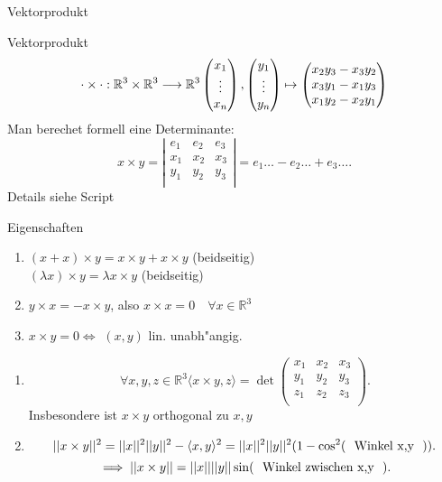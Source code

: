 \documentclass[class=article, crop=false]{standalone}
\begin{document}
\begin{zettel}{Vektorprodukt}
\begin{flashcard}[9z5podc9]{Vektorprodukt}
	\[
		\cdot \times \cdot  : \mathbb{R}^3 \times \mathbb{R}^3 \longrightarrow \mathbb{R}^3\\ \begin{pmatrix}x_1\\ \vdots \\x_n\end{pmatrix}, \begin{pmatrix}y_1\\ \vdots \\ y_n\end{pmatrix} \mapsto \begin{pmatrix}
			x_2 y_3 - x_3 y_2 \\
			x_3 y_1 - x_1 y_3 \\
			x_1 y_2 - x_2 y_1 \\
		\end{pmatrix}
	\]
	Man berechet formell eine Determinante:
	\[
		x \times y = \left|\begin{matrix}
			e_1 & e_2 & e_3 \\
			x_1 & x_2 & x_3 \\
			y_1 & y_2 & y_3 \\
		\end{matrix}\right| = e_1 \dots - e_2 \dots + e_3 \dots
	.\]
	Details siehe Script
\end{flashcard}

\begin{remark}
	Eigenschaften
	\begin{enumerate}
		\item $(x + x )\times y =  x \times  y +  x \times y$ (beidseitig)\\

		      $(\lambda x )\times y =  \lambda  x \times y$ (beidseitig)
		\item $y \times  x =  -  x \times y$, also $x \times x = 0 \quad \forall x \in  \mathbb{R}^3 $
		\item $x \times y = 0 \iff $ $(x,y)$ lin. unabh"angig.
	\end{enumerate}
\end{remark}
\begin{lemma}[4.1]
	\begin{enumerate}
		\item
		      \[
			      \forall x,y,z \in  \mathbb{R}^3  \langle x \times  y, z\rangle =  \det \begin{pmatrix}
				      x_1 & x_2 & x_3 \\
				      y_1 & y_2 & y_3 \\
				      z_1 & z_2 & z_3 \\
			      \end{pmatrix}
		      .\]
		      Insbesondere ist $x \times y$ orthogonal zu $x,y$
		\item
		      \[
			      ||x \times y||^2  = ||x||^2 ||y||^2 - \langle x,y\rangle ^2 = ||x||^2 ||y||^2 (1 - \cos^2( \tx{ Winkel x,y } ))
		      .\]
		      \[
			      \implies ||x \times y|| =  ||x|| ||y|| \sin( \tx{ Winkel zwischen x,y } )
		      .\]


\end{enumerate}
\end{lemma}
\end{zettel}
\end{document}
